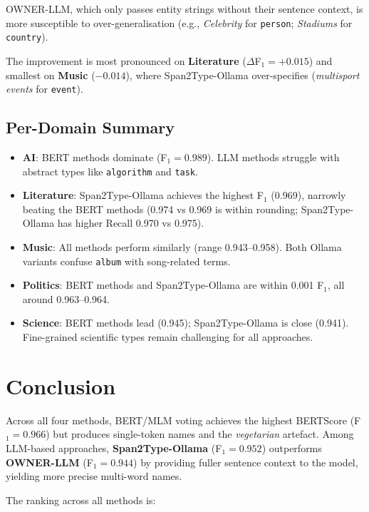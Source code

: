 \documentclass[11pt,a4paper]{article}
\begin{document}
OWNER-LLM, which only passes entity strings without their sentence context,
is more susceptible to over-generalisation (e.g., \textit{Celebrity} for
\texttt{person}; \textit{Stadiums} for \texttt{country}).

The improvement is most pronounced on \textbf{Literature} ($\Delta$F$_1 =
+0.015$) and smallest on \textbf{Music} ($-0.014$), where Span2Type-Ollama
over-specifies (\textit{multisport events} for \texttt{event}).

\subsection{Per-Domain Summary}

\begin{itemize}[leftmargin=1.5em]
  \item \textbf{AI}: BERT methods dominate (F$_1=0.989$). LLM methods
    struggle with abstract types like \texttt{algorithm} and \texttt{task}.
  \item \textbf{Literature}: Span2Type-Ollama achieves the highest F$_1$
    (0.969), narrowly beating the BERT methods (0.974 vs 0.969 is within
    rounding; Span2Type-Ollama has higher Recall 0.970 vs 0.975).
  \item \textbf{Music}: All methods perform similarly (range 0.943--0.958).
    Both Ollama variants confuse \texttt{album} with song-related terms.
  \item \textbf{Politics}: BERT methods and Span2Type-Ollama are within
    0.001 F$_1$, all around 0.963--0.964.
  \item \textbf{Science}: BERT methods lead (0.945); Span2Type-Ollama
    is close (0.941). Fine-grained scientific types remain challenging
    for all approaches.
\end{itemize}

\section{Conclusion}

Across all four methods, BERT/MLM voting achieves the highest BERTScore
(F$_1=0.966$) but produces single-token names and the \textit{vegetarian}
artefact. Among LLM-based approaches, \textbf{Span2Type-Ollama} (F$_1=0.952$)
outperforms \textbf{OWNER-LLM} (F$_1=0.944$) by providing fuller sentence
context to the model, yielding more precise multi-word names.

The ranking across all methods is:
\end{document}
